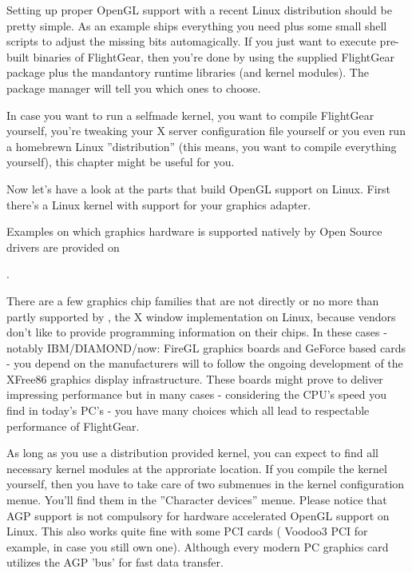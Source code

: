 Setting up proper OpenGL support with a recent Linux distribution should be
pretty simple. As an example  ships everything you need plus some small
shell scripts to adjust the missing bits automagically. If you just want to
execute pre-built binaries of FlightGear, then you're done by using the
supplied FlightGear package plus the mandantory runtime libraries (and
kernel modules). The package manager will tell you which ones to choose.

In case you want to run a selfmade kernel, you want to compile FlightGear
yourself, you're tweaking your X server configuration file yourself or you
even run a homebrewn Linux ''distribution'' (this means, you want to compile
everything yourself), this chapter might be useful for you.

Now let's have a look at the parts that build OpenGL support on Linux. First
there's a Linux kernel with support for your graphics adapter.

Examples on which graphics hardware is supported natively by Open Source
drivers are provided on
\medskip

\noindent
{}.
\medskip

There are a few graphics chip families that are not directly or no more than
partly supported by , the X window implementation on Linux, because
vendors don't like to provide programming information on their chips. In
these cases - notably IBM/DIAMOND/now:  FireGL graphics boards and 
GeForce based cards - you depend on the manufacturers will to follow the
ongoing development of the XFree86 graphics display infrastructure. These
boards might prove to deliver impressing performance but in many cases -
considering the CPU's speed you find in today's PC's - you have many choices
which all lead to respectable performance of FlightGear.

As long as you use a distribution provided kernel, you can expect to find
all necessary kernel modules at the approriate location. If you compile the
kernel yourself, then you have to take care of two submenues in the kernel
configuration menue. You'll find them in the ''Character devices'' menue.
Please notice that AGP support is not compulsory for hardware accelerated
OpenGL support on Linux. This also works quite fine with some PCI cards
( Voodoo3 PCI for example, in case you still own one). Although every
modern PC graphics card utilizes the AGP 'bus' for fast data transfer.

